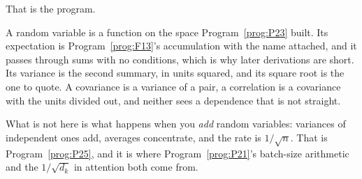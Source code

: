 \begin{fr}
That is the program.

A random variable is a function on the space Program~\ref{prog:P23} built. Its
expectation is Program~\ref{prog:F13}'s accumulation with the name attached,
and it passes through sums with no conditions, which is why later derivations
are short. Its variance is the second summary, in units squared, and its
square root is the one to quote. A covariance is a variance of a pair, a
correlation is a covariance with the units divided out, and neither sees a
dependence that is not straight.

What is not here is what happens when you \emph{add} random variables:
variances of independent ones add, averages concentrate, and the rate is
$1/\sqrt{n}$. That is Program~\ref{prog:P25}, and it is where
Program~\ref{prog:P21}'s batch-size arithmetic and the $1/\sqrt{d_k}$ in
attention both come from.

\end{fr}

